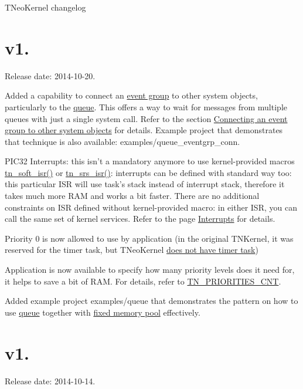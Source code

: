 T\+Neo\+Kernel changelog\hypertarget{changelog_changelog_v1_03}{}\section{v1.}\label{changelog_changelog_v1_03}
Release date\+: 2014-\/10-\/20.


\begin{DoxyItemize}
\item Added a capability to connect an \hyperlink{tn__eventgrp_8h}{event group} to other system objects, particularly to the \hyperlink{tn__dqueue_8h}{queue}. This offers a way to wait for messages from multiple queues with just a single system call. Refer to the section \hyperlink{tn__eventgrp_8h_eventgrp_connect}{Connecting an event group to other system objects} for details. Example project that demonstrates that technique is also available\+: {\ttfamily examples/queue\+\_\+eventgrp\+\_\+conn}.
\item P\+I\+C32 Interrupts\+: this isn't a mandatory anymore to use kernel-\/provided macros {\ttfamily \hyperlink{tn__arch__pic32_8h_a46a860d030e59e2c6aa827ca5ad36a37}{tn\+\_\+soft\+\_\+isr()}} or {\ttfamily \hyperlink{tn__arch__pic32_8h_acb97f377bb993c30f6c83c582978d895}{tn\+\_\+srs\+\_\+isr()}}\+: interrupts can be defined with standard way too\+: this particular I\+S\+R will use task's stack instead of interrupt stack, therefore it takes much more R\+A\+M and works a bit faster. There are no additional constraints on I\+S\+R defined without kernel-\/provided macro\+: in either I\+S\+R, you can call the same set of kernel services. Refer to the page \hyperlink{interrupts}{Interrupts} for details.
\item Priority 0 is now allowed to use by application (in the original T\+N\+Kernel, it was reserved for the timer task, but T\+Neo\+Kernel \hyperlink{tnkernel_diff_tnkernel_diff_timer_task}{does not have timer task})
\item Application is now available to specify how many priority levels does it need for, it helps to save a bit of R\+A\+M. For details, refer to {\ttfamily \hyperlink{tn__cfg__default_8h_aad74a059c61567c68a1e9067ab47a256}{T\+N\+\_\+\+P\+R\+I\+O\+R\+I\+T\+I\+E\+S\+\_\+\+C\+N\+T}}.
\item Added example project {\ttfamily examples/queue} that demonstrates the pattern on how to use \hyperlink{tn__dqueue_8h}{queue} together with \hyperlink{tn__fmem_8h}{fixed memory pool} effectively.
\end{DoxyItemize}\hypertarget{changelog_changelog_v1_02}{}\section{v1.}\label{changelog_changelog_v1_02}
Release date\+: 2014-\/10-\/14.


